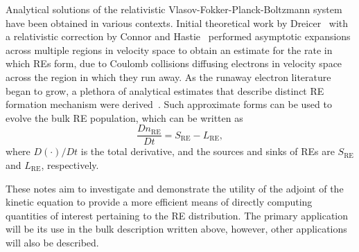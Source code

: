\documentclass[preprint,aip]{revtex4-2}
\begin{document}
Analytical solutions of the relativistic Vlasov-Fokker-Planck-Boltzmann system have been obtained in various contexts. Initial theoretical work by Dreicer~\cite{dreicer1959electron,dreicer1960electron} with a relativistic correction by Connor and Hastie~\cite{connor1975relativistic} performed asymptotic expansions across multiple regions in velocity space to obtain an estimate for the rate in which REs form, due to Coulomb collisions diffusing electrons in velocity space across the region in which they run away. As the runaway electron literature began to grow, a plethora of analytical estimates that describe distinct RE formation mechanism were derived~\cite{rosenbluth1997runaway,smith2008hot,martin2017formation,hesslow2019influence,ekmark2024fluid}. Such approximate forms can be used to evolve the bulk RE population, which can be written as
\begin{equation*}
\frac{Dn_\mathrm{RE}}{Dt} = S_\mathrm{RE} - L_\mathrm{RE},
\end{equation*}
where $D(\cdot)/Dt$ is the total derivative, and the sources and sinks of REs are $S_\mathrm{RE}$ and $L_\mathrm{RE}$, respectively.

These notes aim to investigate and demonstrate the utility of the adjoint of the kinetic equation to provide a more efficient means of directly computing quantities of interest pertaining to the RE distribution. The primary application will be its use in the bulk description written above, however, other applications will also be described.
\end{document}
